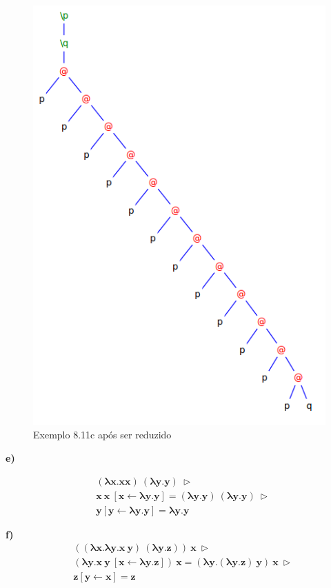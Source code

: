 \documentclass[a4paper]{article}
\begin{document}
\begin{figure}[h]
  \centering
  \includegraphics[scale=0.5]{8-11c_2.png}
  \caption{Exemplo 8.11c após ser reduzido}
\end{figure}


\FloatBarrier
\textbf{e)}

\begin{align*}
&\mathbf{(\lambda x.x x)\ (\lambda y.y)\ \rhd} \\
&\mathbf{x\ x\ [x \leftarrow \lambda y.y] = (\lambda y.y)\ (\lambda y.y)\ \rhd} \\
&\mathbf{y [y \leftarrow \lambda y.y] = \lambda y.y}
\end{align*}

\textbf{f)}
\begin{align*}
&\mathbf{((\lambda x.\lambda y.x\ y)\ (\lambda y.z))\ x\ \rhd} \\
&\mathbf{(\lambda y.x\ y\ [x \leftarrow \lambda y.z])\ x = (\lambda y.(\lambda y.z)\ y)\ x\ \rhd} \\
&\mathbf{z [y \leftarrow x] = z}
\end{align*}
\end{document}
